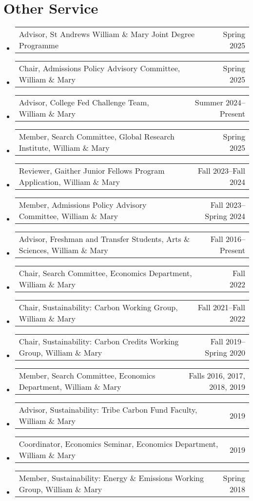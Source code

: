 \documentclass[10pt,letterpaper,en-US]{article}
\makeatletter
\newcommand{\itemrow}[2]
{\begin{tabular*}{\linewidth}{l@{\extracolsep{\fill}}r}
	#1 & #2 \\
\end{tabular*}}
\makeatother
\begin{document}
\section*{Other Service}
\begin{itemize}
    \item \itemrow{Advisor, St Andrews William \& Mary Joint Degree Programme}{Spring 2025}
    \item \itemrow{Chair, Admissions Policy Advisory Committee, William \& Mary}{Spring 2025}
    \item \itemrow{Advisor, College Fed Challenge Team, William \& Mary}{Summer 2024--Present}
    \item \itemrow{Member, Search Committee, Global Research Institute, William \& Mary}{Spring 2025}
    \item \itemrow{Reviewer, Gaither Junior Fellows Program Application, William \& Mary}{Fall 2023--Fall 2024}
    \item \itemrow{Member, Admissions Policy Advisory Committee, William \& Mary}{Fall 2023--Spring 2024}
    \item \itemrow{Advisor, Freshman and Transfer Students, Arts \& Sciences, William \& Mary}{Fall 2016--Present}
    \item \itemrow{Chair, Search Committee, Economics Department, William \& Mary}{Fall 2022}
    \item \itemrow{Chair, Sustainability: Carbon Working Group, William \& Mary}{Fall 2021--Fall 2022}
    \item \itemrow{Chair, Sustainability: Carbon Credits Working Group, William \& Mary}{Fall 2019--Spring 2020}
    \item \itemrow{Member, Search Committee, Economics Department, William \& Mary}{Falls 2016, 2017, 2018, 2019}
    \item \itemrow{Advisor, Sustainability: Tribe Carbon Fund Faculty, William \& Mary}{2019}
    \item \itemrow{Coordinator, Economics Seminar, Economics Department, William \& Mary}{2019}
    \item \itemrow{Member, Sustainability: Energy \& Emissions Working Group, William \& Mary}{Spring 2018}
\end{itemize}
\end{document}
